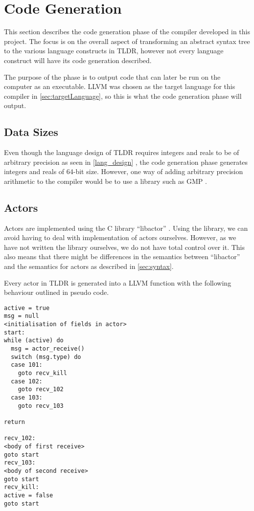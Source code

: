 \section{Code Generation}

This section describes the code generation phase of the compiler developed in this project. The focus is on the overall aspect of transforming an abstract syntax tree to the various language constructs in TLDR, however not every language construct will have its code generation described. 

The purpose of the phase is to output code that can later be run on the computer as an executable. LLVM was chosen as the target language for this compiler in \cref{sec:targetLanguage}, so this is what the code generation phase will output. 

\subsection{Data Sizes}

Even though the language design of TLDR requires integers and reals to be of arbitrary precision as seen in \cref{lang_design} , the code generation phase generates integers and reals of 64-bit size. However, one way of adding arbitrary precision arithmetic to the compiler would be to use a library such as GMP \cite{gmp}.

\subsection{Actors}

Actors are implemented using the C library \enquote{libactor} \cite{libactor}. Using the library, we can avoid having to deal with implementation of actors ourselves. However, as we have not written the library ourselves, we do not have total control over it. This also means that there might be differences in the semantics between \enquote{libactor} and the semantics for actors as described in \cref{sec:syntax}.

Every actor in TLDR is generated into a LLVM function with the following behaviour outlined in pseudo code.

\begin{verbatim}
active = true
msg = null
<initialisation of fields in actor>
start:
while (active) do
  msg = actor_receive()
  switch (msg.type) do
  case 101:
    goto recv_kill
  case 102:
    goto recv_102
  case 103:
    goto recv_103

return

recv_102:
<body of first receive>
goto start 
recv_103:
<body of second receive>
goto start 
recv_kill:
active = false
goto start
\end{verbatim}

